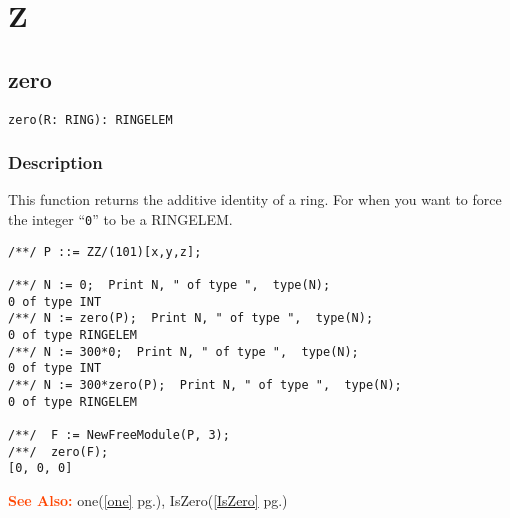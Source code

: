 \documentclass[a4paper]{mybook}
\newenvironment{command}{}{} %
\newcommand\SeeAlso{\par\textcolor{OrangeRed}{\textbf{\large See Also: }}}
\begin{document}
\chapter{Z}  %
\label{Z}

\section{zero}
\label{zero}
\begin{command} %


\begin{Verbatim}[label=syntax, rulecolor=\color{MidnightBlue},
frame=single]
zero(R: RING): RINGELEM
\end{Verbatim}


\subsection*{Description}

This function returns the additive identity of a ring.
For when you want to force the integer ``\verb&0&'' to be a RINGELEM.
\begin{Verbatim}[label=example, rulecolor=\color{PineGreen}, frame=single]
/**/ P ::= ZZ/(101)[x,y,z];

/**/ N := 0;  Print N, " of type ",  type(N);
0 of type INT
/**/ N := zero(P);  Print N, " of type ",  type(N);
0 of type RINGELEM
/**/ N := 300*0;  Print N, " of type ",  type(N);
0 of type INT
/**/ N := 300*zero(P);  Print N, " of type ",  type(N);
0 of type RINGELEM

/**/  F := NewFreeModule(P, 3);
/**/  zero(F);
[0, 0, 0]
\end{Verbatim}


\SeeAlso %
  one(\ref{one} pg.\pageref{one}), 
    IsZero(\ref{IsZero} pg.\pageref{IsZero})
\end{command} %
\end{document}
